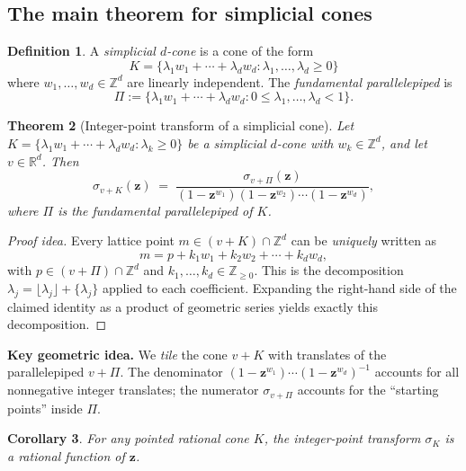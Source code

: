 \documentclass[11pt]{article}
\theoremstyle{plain}
\newtheorem{theorem}{Theorem}[section]
\newtheorem{corollary}[theorem]{Corollary}
\theoremstyle{definition}
\newtheorem{definition}[theorem]{Definition}
\newcommand{\Z}{\mathbb{Z}}
\newcommand{\R}{\mathbb{R}}
\begin{document}
\subsection{The main theorem for simplicial cones}

\begin{definition}
  A \emph{simplicial $d$-cone} is a cone of the form
  \[
    K = \{\lambda_1 w_1 + \cdots + \lambda_d w_d : \lambda_1, \ldots, \lambda_d \geq 0\}
  \]
  where $w_1, \ldots, w_d \in \Z^d$ are linearly independent.  The
  \emph{fundamental parallelepiped} is
  \[
    \Pi := \{\lambda_1 w_1 + \cdots + \lambda_d w_d :
             0 \leq \lambda_1, \ldots, \lambda_d < 1\}.
  \]
\end{definition}

\begin{theorem}[Integer-point transform of a simplicial cone]
  \label{thm:ipt}
  Let $K = \{\lambda_1 w_1 + \cdots + \lambda_d w_d : \lambda_k \geq 0\}$ be a
  simplicial $d$-cone with $w_k \in \Z^d$, and let $v \in \R^d$.  Then
  \[
    \sigma_{v+K}(\mathbf{z})
    \;=\;
    \frac{\sigma_{v+\Pi}(\mathbf{z})}
         {(1-\mathbf{z}^{w_1})(1-\mathbf{z}^{w_2})\cdots(1-\mathbf{z}^{w_d})},
  \]
  where $\Pi$ is the fundamental parallelepiped of $K$.
\end{theorem}

\begin{proof}[Proof idea]
  Every lattice point $m \in (v+K) \cap \Z^d$ can be \emph{uniquely} written
  as
  \[
    m = p + k_1 w_1 + k_2 w_2 + \cdots + k_d w_d,
  \]
  with $p \in (v+\Pi) \cap \Z^d$ and $k_1, \ldots, k_d \in \Z_{\geq 0}$.
  This is the decomposition $\lambda_j = \lfloor\lambda_j\rfloor + \{\lambda_j\}$
  applied to each coefficient.  Expanding the right-hand side of the claimed
  identity as a product of geometric series yields exactly this decomposition.
\end{proof}

\begin{keybox}
\textbf{Key geometric idea.}  We \emph{tile} the cone $v + K$ with translates
of the parallelepiped $v+\Pi$.  The denominator
$(1-\mathbf{z}^{w_1})\cdots(1-\mathbf{z}^{w_d})^{-1}$ accounts for all
nonneg\-ative integer translates; the numerator $\sigma_{v+\Pi}$ accounts for
the ``starting points'' inside $\Pi$.
\end{keybox}

\begin{corollary}
  For any pointed rational cone $K$, the integer-point transform $\sigma_K$
  is a \emph{rational function} of $\mathbf{z}$.
\end{corollary}
\end{document}
